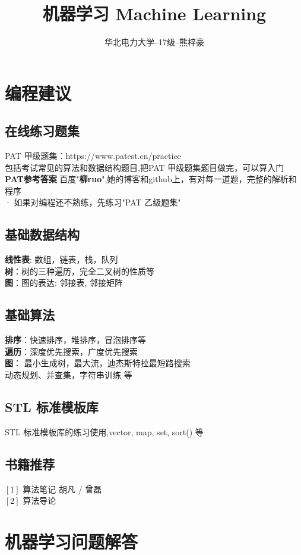\documentclass{article}
\title{机器学习 Machine Learning}\author{华北电力大学--17级--熊梓豪}\date{}
\begin{document}
\maketitle
\tableofcontents
\newpage

\section{编程建议}
\subsection{在线练习题集}
PAT 甲级题集：https://www.patest.cn/practice\\
包括考试常见的算法和数据结构题目,把PAT 甲级题集题目做完，可以算入门\\
\textbf{PAT参考答案} 百度"\textbf{柳ruo}",她的博客和github上，有对每一道题，完整的解析和程序\\
· 如果对编程还不熟练，先练习"PAT 乙级题集"

\subsection{基础数据结构}
\textbf{线性表}: 数组，链表，栈，队列\\
\textbf{树}：树的三种遍历，完全二叉树的性质等\\
\textbf{图}：图的表达: 邻接表, 邻接矩阵

\subsection{基础算法}
\textbf{排序}：快速排序，堆排序，冒泡排序等\\
\textbf{遍历}：深度优先搜索，广度优先搜索\\
\textbf{图}： 最小生成树，最大流，迪杰斯特拉最短路搜索\\
动态规划、并查集，字符串训练 等

\subsection{STL 标准模板库}
STL 标准模板库的练习使用,vector, map, set, sort() 等 

\subsection{书籍推荐}
$[1]$ 算法笔记  胡凡 / 曾磊\\
$[2]$ 算法导论


\newpage
\section{机器学习问题解答}
\end{document}
